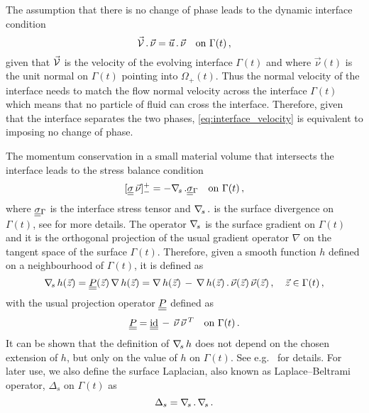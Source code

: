 The assumption that there is no change of phase leads to the dynamic interface
condition
\begin{equation}\label{eq:interface_velocity}
\vec{\mathcal{V}}\,.\,\vec\nu = \vec u\,.\,\vec \nu \quad \mbox{on }
\Gamma(t)\,,
\end{equation}
given that $\vec{\mathcal{V}}$ is the velocity of the evolving interface
$\Gamma(t)$ and where $\vec\nu(t)$ is the unit normal on $\Gamma(t)$ pointing
into $\Omega_+(t)$. Thus the normal velocity of the interface needs to
match the flow normal velocity across the interface $\Gamma(t)$ which means
that no particle of fluid can cross the interface. Therefore, given that the
interface separates the two phases, \ref{eq:interface_velocity} is equivalent to
imposing no change of phase.

The momentum conservation in a small material volume that intersects the
interface leads to the stress balance condition
\begin{equation}\label{eq:interface_jump_stress_div}
[\mat\sigma\,\vec \nu]_-^+ = -\nabs\,.\mat\sigma_{\Gamma} \quad \mbox{on }
\Gamma(t)\,,
\end{equation}
where $\mat\sigma_{\Gamma}$ is the interface stress tensor and $\nabla_{\!s}\,.$ is
the surface divergence on $\Gamma(t)$, see \cite{GrossR11} for more details.
The operator $\nabla_{\!s}$ is the surface gradient on $\Gamma(t)$ and it is the
orthogonal projection of the usual gradient operator $\nabla$ on the tangent
space of the surface $\Gamma(t)$. Therefore, given a smooth function $h$
defined on a neighbourhood of $\Gamma(t)$, it is defined as
\begin{equation}\label{eq:surface_gradient}
\nabs\,h(\vec z)=\mat P(\vec z)\,\nabla\,h(\vec z)=\nabla\,h(\vec z)\,-
\,\nabla\,h(\vec z)\,.\,\vec\nu(\vec z)\,\vec\nu(\vec z)\,,\quad \vec z
\in\Gamma(t)\,,
\end{equation}
with the usual projection operator $\mat P$ defined as
\begin{equation}\label{eq:surface_projection}
\mat P=\mat\id\,-\,\vec\nu\,\vec\nu\,^T\quad \mbox{on } \Gamma(t)\,.
\end{equation}
It can be shown that the definition of $\nabla_{\!s}\,h$ does not depend on the chosen
extension of $h$, but only on the value of $h$ on $\Gamma(t)$. See e.g.\
\cite[\S2.1]{DeckelnickDE05} for details.
For later use, we also define the surface
Laplacian, also known as Laplace--Beltrami operator, $\Delta_s$ on $\Gamma(t)$
as
\begin{equation}\label{eq:surface_laplacian}
\Delta_s = \nabla_{\!s}\,.\,\nabla_{\!s}\,.
\end{equation}

